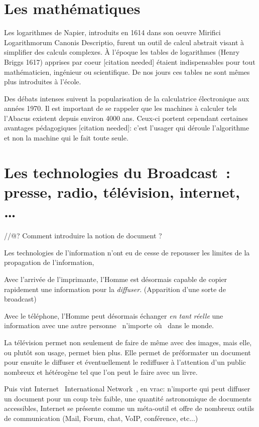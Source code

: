 \section{Les mathématiques}
Les logarithmes de Napier, introduits en 1614 dans son oeuvre \og{}Mirifici Logarithmorum Canonis Descriptio\fg{}, furent un outil de calcul abstrait visant à simplifier des calculs complexes. À l'époque les tables de logarithmes (Henry Briggs 1617) apprises par coeur [citation
  needed] étaient indispensables pour tout mathématicien, ingénieur ou scientifique. De nos jours ces tables ne sont mêmes plus introduites à l'école.

Des débats intenses suivent la popularisation de la calculatrice électronique 
aux années 1970. Il est important de se rappeler que les 
machines à calculer tels l'Abacus existent depuis environ 4000 ans. Ceux-ci 
portent cependant certaines avantages pédagogiques [citation needed]: c'est 
l'usager qui déroule l'algorithme et non la machine qui le fait toute seule. 

\section{Les technologies du \og{}Broadcast\fg{}~: presse, radio, télévision, internet, \ldots}


//@? Comment introduire la notion de document ?

Les technologies de l'information n'ont eu de cesse de repousser les limites de
la propagation de l'information, 

Avec l'arrivée de l'imprimante, l'Homme est désormais capable de copier
rapidement une information pour la \emph{diffuser}. (Apparition d'une sorte
de broadcast)

Avec le téléphone, l'Homme peut désormais échanger \emph{en tant réelle} une 
information avec une autre personne \og{}~n'importe où~\fg{} dans le monde.

La télévision permet non seulement de faire de même avec des images, mais elle,
ou plutôt son usage, permet bien plus. Elle permet de préformater un document pour ensuite le
diffuser et éventuellement le rediffuser à l'attention d'un public nombreux et
hétérogène tel que l'on peut le faire avec un livre.

Puis vint Internet \og{}~International Network~\fg{}, en vrac: n'importe qui
peut diffuser un document pour un coup très faible, une quantité astronomique
de documents accessibles, Internet se présente comme un méta-outil et offre de
nombreux outils de communication (Mail, Forum, chat, VoIP, conférence, etc...)

